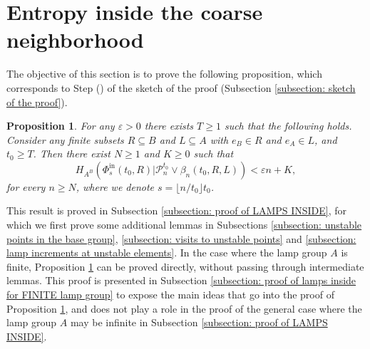 \documentclass[reqno,oneside,11pt]{amsart}
\theoremstyle{plain}
\newtheorem{prop}[thm]{Proposition}
\theoremstyle{definition}
\begin{document}
\section{Entropy inside the coarse neighborhood}\label{section: entropy inside the coarse neighborhood}
The objective of this section is to prove the following proposition, which  corresponds to Step () of the sketch of the proof (Subsection \ref{subsection: sketch of the proof}).
\begin{prop}\label{prop: the lamp config INSIDE the neighborhood has small entropy}
	For any $\varepsilon>0$ there exists $T\ge 1$ such that the following holds. Consider any finite subsets $R\subseteq B$ and $L\subseteq A$ with $e_B\in R$ and $e_A\in L$, and $t_0\ge T$. Then there exist $N\ge 1$ and $K\ge 0$ such that
	\begin{equation}\label{eq: lamp config INSIDE}
		H_{A^{B}}\left( \Phi_{s}^{\mathrm{in}}(t_0,R)\Big| \mathcal{P}_n^{t_0}\vee\beta_n(t_0,R,L)\right)<\varepsilon n + K,
	\end{equation}
	for every $n\ge N$, where we denote $s=\lfloor n/t_0\rfloor t_0$.
\end{prop}

This result is proved in Subsection \ref{subsection: proof of LAMPS INSIDE}, for which we first prove some additional lemmas in Subsections \ref{subsection: unstable points in the base group}, \ref{subsection: visits to unstable points} and \ref{subsection: lamp increments at unstable elements}. In the case where the lamp group $A$ is finite, Proposition \ref{prop: the lamp config INSIDE the neighborhood has small entropy} can be proved directly, without passing through intermediate lemmas. This proof is presented in Subsection \ref{subsection: proof of lamps inside for FINITE lamp group} to expose the main ideas that go into the proof of Proposition \ref{prop: the lamp config INSIDE the neighborhood has small entropy}, and does not play a role in the proof of the general case where the lamp group $A$ may be infinite in Subsection \ref{subsection: proof of LAMPS INSIDE}.
\end{document}
